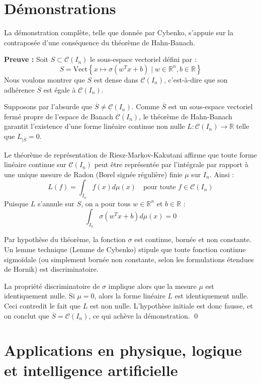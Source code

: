 \documentclass[11pt,a4paper]{article}
\begin{document}
\section{Démonstrations}

La démonstration complète, telle que donnée par Cybenko, s'appuie sur la contraposée d'une conséquence du théorème de Hahn-Banach.

\textbf{Preuve :}
Soit $S \subset \mathcal{C}(I_n)$ le sous-espace vectoriel défini par :
$$S = \text{Vect} \left\lbrace x \mapsto \sigma(w^T x + b) \mid w \in \mathbb{R}^n, b \in \mathbb{R} \right\rbrace$$
Nous voulons montrer que $S$ est dense dans $\mathcal{C}(I_n)$, c'est-à-dire que son adhérence $\overline{S}$ est égale à $\mathcal{C}(I_n)$.

Supposons par l'absurde que $\overline{S} \neq \mathcal{C}(I_n)$. Comme $\overline{S}$ est un sous-espace vectoriel fermé propre de l'espace de Banach $\mathcal{C}(I_n)$, le théorème de Hahn-Banach garantit l'existence d'une forme linéaire continue non nulle $L : \mathcal{C}(I_n) \to \mathbb{R}$ telle que $L_{|\overline{S}} = 0$.

Le théorème de représentation de Riesz-Markov-Kakutani affirme que toute forme linéaire continue sur $\mathcal{C}(I_n)$ peut être représentée par l'intégrale par rapport à une unique mesure de Radon (Borel signée régulière) finie $\mu$ sur $I_n$. Ainsi :
$$L(f) = \int_{I_n} f(x) d\mu(x) \quad \text{pour toute } f \in \mathcal{C}(I_n)$$
Puisque $L$ s'annule sur $S$, on a pour tous $w \in \mathbb{R}^n$ et $b \in \mathbb{R}$ :
$$\int_{I_n} \sigma(w^T x + b) d\mu(x) = 0$$

Par hypothèse du théorème, la fonction $\sigma$ est continue, bornée et non constante. Un lemme technique (Lemme de Cybenko) stipule que toute fonction continue sigmoïdale (ou simplement bornée non constante, selon les formulations étendues de Hornik) est discriminatoire.

La propriété discriminatoire de $\sigma$ implique alors que la mesure $\mu$ est identiquement nulle.
Si $\mu = 0$, alors la forme linéaire $L$ est identiquement nulle.
Ceci contredit le fait que $L$ est non nulle.
L'hypothèse initiale est donc fausse, et on conclut que $\overline{S} = \mathcal{C}(I_n)$, ce qui achève la démonstration. \qed

\section{Applications en physique, logique et intelligence artificielle}
\end{document}
